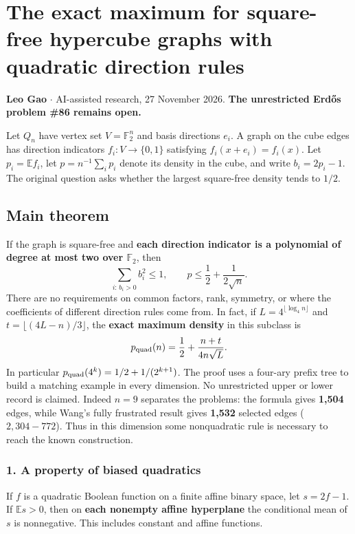 \documentclass[
  10pt,
]{article}
\author{}
\date{}
\begin{document}
\section{The exact maximum for square-free hypercube graphs with
quadratic direction
rules}\label{the-exact-maximum-for-square-free-hypercube-graphs-with-quadratic-direction-rules}

\textbf{Leo Gao} $\cdot$ AI-assisted research, 27 November 2026. \textbf{The unrestricted Erdős
problem \#86 remains open.}

Let \(Q_n\) have vertex set \(V=\mathbb F_2^n\) and basis directions
\(e_i\). A graph on the cube edges has direction indicators
\(f_i:V\to\{0,1\}\) satisfying \(f_i(x+e_i)=f_i(x)\). Let
\(p_i=\mathbb{E} f_i\), let \(p=n^{-1}\sum_i p_i\) denote its density in
the cube, and write \(b_i=2p_i-1\). The original question asks whether
the largest square-free density tends to \(1/2\).

\subsection{Main theorem}\label{main-theorem}

If the graph is square-free and \textbf{each direction indicator is a
polynomial of degree at most two over \(\mathbb F_2\)}, then \[
\sum_{i:\,b_i>0} b_i^2\le 1,\qquad
p \le \frac12+\frac1{2\sqrt n}.
\] There are no requirements on common factors, rank, symmetry, or where
the coefficients of different direction rules come from. In fact, if
\(L=4^{\lfloor\log_4 n\rfloor}\) and \(t=\lfloor(4L-n)/3\rfloor\), the
\textbf{exact maximum density} in this subclass is \[
p_{\rm quad}(n)=\frac12+\frac{n+t}{4n\sqrt L}.
\] In particular \(p_{\rm quad}(4^k)=1/2+1/(2^{k+1})\). The proof uses a
four-ary prefix tree to build a matching example in every dimension. No
unrestricted upper or lower record is claimed. Indeed \(n=9\) separates
the problems: the formula gives \textbf{1,504} edges, while Wang's fully
frustrated result gives \textbf{1,532} selected edges (\(2,304-772\)).
Thus in this dimension some nonquadratic rule is necessary to reach the
known construction.

\subsubsection{1. A property of biased
quadratics}\label{a-property-of-biased-quadratics}

If \(f\) is a quadratic Boolean function on a finite affine binary
space, let \(s=2f-1\). If \(\mathbb E s>0\), then on \textbf{each
nonempty affine hyperplane} the conditional mean of \(s\) is
nonnegative. This includes constant and affine functions.
\end{document}
